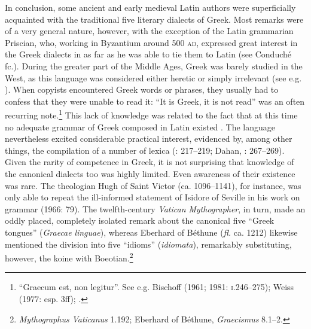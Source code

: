 In conclusion, some ancient and early medieval Latin authors were superficially acquainted with the traditional five literary dialects of Greek. Most remarks were of a very general nature, however, with the exception of the Latin grammarian Priscian, who, working in Byzantium around 500 \textsc{ad}, expressed great interest in the Greek dialects in as far as he was able to tie them to Latin (see Conduché fc.). During the greater part of the Middle Ages, Greek was barely studied in the West, as this language was considered either heretic or simply irrelevant (see e.g. \citealt{Boulhol2014}). When copyists encountered Greek words or phrases, they usually had to confess that they were unable to read it: “It is Greek, it is not read” was an often recurring note.\footnote{ “Graecum est, non legitur”. \textrm{See e.g. Bischoff (1961; 1981:} \textrm{\textsc{i.}}\textrm{246–275); Weiss (1977: esp. 3ff);}\textrm{ }\textrm{\citet[36]{Saladin2000}.}} This lack of knowledge was related to the fact that at this time no adequate grammar of Greek composed in Latin existed \citep[215]{Bischoff1961}. The language nevertheless excited considerable practical interest, evidenced by, among other things, the compilation of a number of lexica (\citealt{Bischoff1961}: 217–219; Dahan, \citealt{RosierValente1995}: 267–269). Given the rarity of competence in Greek, it is not surprising that knowledge of the canonical dialects too was highly limited. Even awareness of their existence was rare. The theologian Hugh of Saint Victor (ca. 1096–1141), for instance, was only able to repeat the ill-informed statement of Isidore of Seville in his work on grammar (1966: 79). The twelfth-century \textit{Vatican} \textit{Mythographer}, in turn, made an oddly placed, completely isolated remark about the canonical five “Greek tongues” (\textit{Graecae} \textit{linguae}), whereas Eberhard of Béthune (\textit{fl.} ca. 1212) likewise mentioned the division into five “idioms” (\textit{idiomata}), remarkably substituting, however, the koine with Boeotian.\footnote{\textit{Mythographus} \textit{Vaticanus} 1.192; Eberhard of Béthune, \textit{Graecismus} 8.1–2.}

